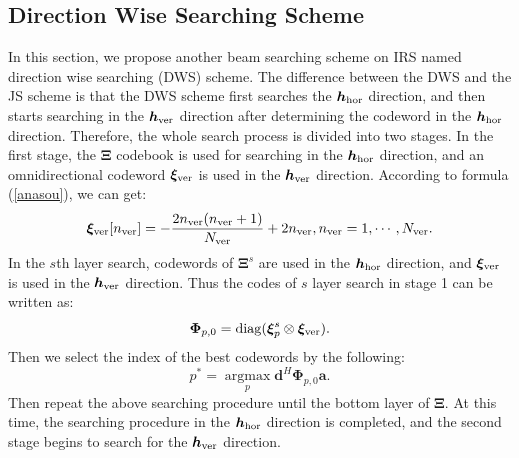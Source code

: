 \documentclass[12pt,draftclsnofoot,onecolumn]{IEEEtran}
\begin{document}
	\subsection{Direction Wise Searching Scheme}
	In this section, we  propose another beam searching scheme on IRS named direction wise searching  (DWS) scheme. The difference between the DWS and the JS scheme is that the DWS scheme first searches the ${\bm h}_{\rm hor}$ direction, and then starts searching in the ${\bm h}_{\rm ver}$ direction after determining the codeword in the ${\bm h}_{\rm hor}$ direction. Therefore, the whole search process is divided into two stages. In the first stage, the $\bm \Xi$ codebook is used for searching in the ${\bm h}_{\rm hor}$ direction, and an omnidirectional codeword ${\bm \xi}_{\rm ver}$ is used in the ${\bm h}_{\rm ver}$ direction. According to formula (\ref{anasou}), we can get:
	\begin{equation}
		{\bm \xi}_{\rm ver}[n_{\rm ver}]=-\frac {2n_{\rm ver}(n_{\rm ver}+1)}{N_{\rm ver}}+2n_{\rm ver}, n_{\rm ver}=1,\cdots,N_{\rm ver}.
	\end{equation}
	In the $s$th layer search, codewords of  ${\bm \Xi}^s$ are used in the ${\bm h}_{\rm hor}$ direction, and ${\bm \xi}_{\rm ver}$ is used in the ${\bm h}_{\rm ver}$ direction. Thus the codes of $s$ layer search in stage 1 can be written as:
	\begin{equation}\label{DWSPhi}
		{\bm  \Phi}_{p,0}={\rm diag}({\bm \xi}^s_p \otimes {\bm \xi}_{\rm ver}).
	\end{equation}	
	Then we select the index of the best codewords by the following:
	\begin{equation}\label{DWSp*}	
		p^*=\mathop{\arg\max}\limits_{p}{\bm d}^H  {\bm \Phi}_{p,0} {\bm a} .
	\end{equation}	
	Then repeat the above searching procedure until the bottom layer of $\bm \Xi$. At this time, the searching procedure  in the ${\bm h}_{\rm hor}$ direction is completed, and the second stage begins to search  for the ${\bm h}_{\rm ver}$ direction.
	
	
	
\end{document}
